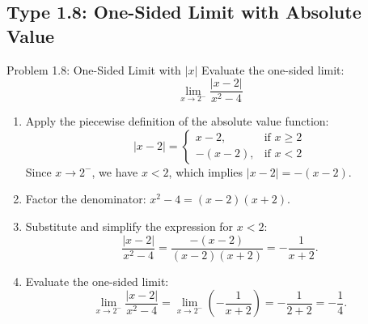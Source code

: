 \documentclass[11pt,a4paper]{article}
\begin{document}
\subsection{Type 1.8: One-Sided Limit with Absolute Value}
\begin{problembox}{Problem 1.8: One-Sided Limit with $|x|$}
Evaluate the one-sided limit:
\[
\lim_{x \to 2^-} \frac{|x - 2|}{x^2 - 4}
\]
\end{problembox}
\begin{solutionbox}
\begin{enumerate}
	\item [Step 1.] Apply the piecewise definition of the absolute value function:
	\begin{equation*}
		|x - 2| = \begin{cases} x - 2, & \text{if } x \ge 2 \\ -(x - 2), & \text{if } x < 2 \end{cases}
	\end{equation*}
	Since $x \to 2^-$, we have $x < 2$, which implies $|x - 2| = -(x - 2)$.

	\item [Step 2.] Factor the denominator: $x^2 - 4 = (x - 2)(x + 2)$.
	
	\item [Step 3.] Substitute and simplify the expression for $x < 2$:
	\begin{equation*}
		\frac{|x - 2|}{x^2 - 4} = \frac{-(x - 2)}{(x - 2)(x + 2)} = -\frac{1}{x + 2}.
	\end{equation*}

	\item [Step 4.] Evaluate the one-sided limit:
	\begin{equation*}
		\lim_{x \to 2^-} \frac{|x - 2|}{x^2 - 4} = \lim_{x \to 2^-} \left(-\frac{1}{x + 2}\right) = -\frac{1}{2 + 2} = -\frac{1}{4}.
	\end{equation*}
\end{enumerate}
\end{solutionbox}
\end{document}
